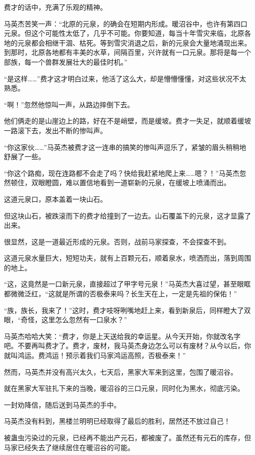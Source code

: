 \begin{this_body}
费才的话中，充满了乐观的精神。

马英杰苦笑一声：“北原的元泉，的确会在短期内形成。暖沼谷中，也许有第四口元泉。但这个可能性太低了，几乎不可能。你要知道，每当十年雪灾来临，北原各地的元泉都会相继干涸、枯死。等到雪灾消退之后，新的元泉会大量地涌现出来。到那时，北原各地都有丰美的水草，间隔百里，兴许就有一口元泉。那将是每一个部族，每一个兽群发展壮大的最佳时机。”

“是这样……”费才这才明白过来，他活了这么大，却是懵懵懂懂，对这些状况不太熟悉。

“啊！”忽然他惊叫一声，从路边摔倒下去。

他们俩走的是山崖边上的路，好在不是峭壁，而是缓坡。费才一失足，就顺着缓坡一路滚下去，发出不断的惨叫声。

“你这家伙……”马英杰被费才这一连串的搞笑的惨叫声逗乐了，紧皱的眉头稍稍地舒展了一些。

“你这个路痴，现在连路都不会走了吗？快给我赶紧地爬上来……嗯？！”马英杰忽然顿住，双眼瞪圆，难以置信地看到一道崭新的元泉，在缓坡上喷涌而出。

这道元泉口，原本盖着一块山石。

但这块山石，被跌滚而下的费才给撞到了一边去。山石覆盖下的元泉，这才显露了出来。

很显然，这是一道最近形成的元泉。否则，战前马家探查，不会探查不到。

这道元泉水量巨大，短短功夫，就有上百颗元石，顺着泉水，喷洒而出，落到周围的地上。

“这，这竟然是一口新元泉，直接超过了甲字号元泉！”马英杰大喜过望，甚至眼眶都微微泛红，“这就是所谓的否极泰来吗？长生天在上，一定是先祖的保佑！”

“族，族长，我来了！”这时，费才吱呀咧嘴地赶上来，看到新泉后，同样瞪大了双眼，“奇怪，这里怎么忽然有一口泉水？”

马英杰哈哈大笑：“费才，你是上天送给我的幸运星。从今天开始，你就改名字吧。不要再叫费才了。费才，废材，我马英杰身边怎么可以有废材？从今以后，你就叫鸿运。费鸿运！预示着我们马家鸿运高照，否极泰来！”

然而，马英杰并没有高兴太久，七天后，黑家大军来到这里，包围了暖沼谷。

就在黑家大军驻扎下来的当晚，暖沼谷的三口元泉，同时化为黑水，彻底污染。

一封劝降信，随后送到马英杰的手中。

马英杰没有料到，黑楼兰明明已经取得了最后的胜利，居然还不放过自己！

被蛊虫污染过的元泉，已经再不能出产元石，都被废了。虽然还有元石的库存，但马家已经失去了继续居住在暖沼谷的可能。


\end{this_body}
